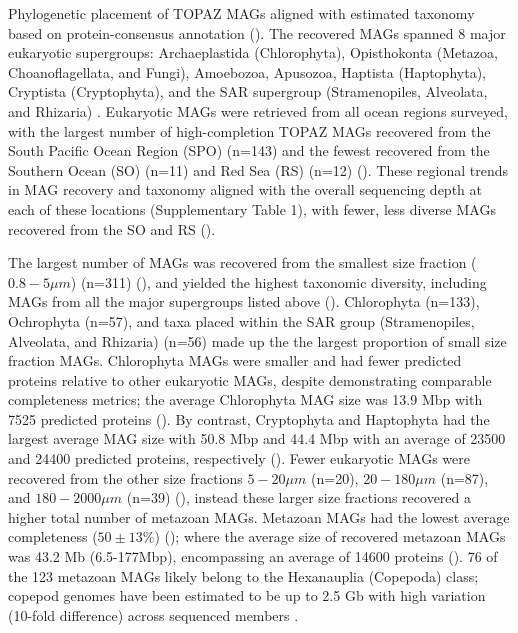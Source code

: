 \documentclass[12pt]{article}
\numberwithin{equation}{section}
\begin{document}
Phylogenetic placement of TOPAZ MAGs aligned with estimated taxonomy based on protein-consensus annotation (). The recovered MAGs spanned 8 major eukaryotic supergroups: Archaeplastida (Chlorophyta), Opisthokonta (Metazoa, Choanoflagellata, and Fungi), Amoebozoa, Apusozoa, Haptista (Haptophyta), Cryptista (Cryptophyta), and the SAR supergroup (Stramenopiles, Alveolata, and Rhizaria) \citep{Burki_2020}. Eukaryotic MAGs were retrieved from all ocean regions surveyed, with the largest number of high-completion TOPAZ MAGs recovered from the South Pacific Ocean Region (SPO) (n=143) and the fewest recovered from the Southern Ocean (SO) (n=11) and Red Sea (RS) (n=12) (). These regional trends in MAG recovery and taxonomy aligned with the overall sequencing depth at each of these locations (Supplementary Table 1), with fewer, less diverse MAGs recovered from the SO and RS ().

The largest number of MAGs was recovered from the smallest size fraction ($0.8-5 \mu m$) (n=311) (), and yielded the highest taxonomic diversity, including MAGs from all the major supergroups listed above (). Chlorophyta (n=133), Ochrophyta (n=57), and taxa placed within the SAR group (Stramenopiles, Alveolata, and Rhizaria) (n=56) made up the  the largest proportion of small size fraction MAGs. Chlorophyta MAGs were smaller and had fewer predicted proteins relative to other eukaryotic MAGs, despite demonstrating comparable completeness metrics; the average Chlorophyta MAG size was 13.9 Mbp with 7525 predicted proteins (). By contrast, Cryptophyta and Haptophyta had the largest average MAG size with 50.8 Mbp and 44.4 Mbp with an average of 23500 and 24400 predicted proteins, respectively (). Fewer eukaryotic MAGs were recovered from the other size fractions $5-20\mu m$ (n=20), $20-180 \mu m$ (n=87), and $180-2000\mu m$ (n=39) (), instead these larger size fractions recovered a higher total number of metazoan MAGs. Metazoan MAGs had the lowest average completeness ($50 \pm 13\%$) (); where the average size of recovered metazoan MAGs was 43.2 Mb (6.5-177Mbp), encompassing an average of 14600 proteins (). 76 of the 123 metazoan MAGs likely belong to the  Hexanauplia (Copepoda) class; copepod genomes have been estimated to be up to 2.5 Gb with high variation (10-fold difference) across sequenced members \citep{Jorgensen_2019}. 
\end{document}
